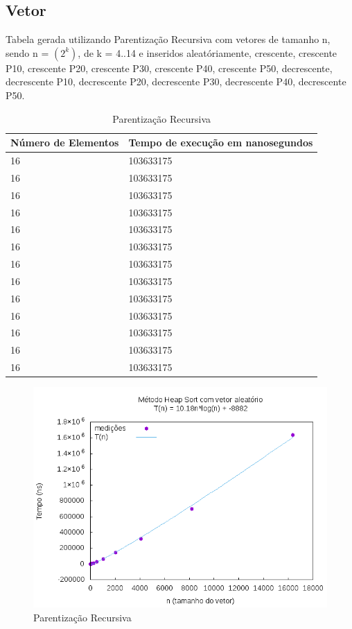 \documentclass[12pt,a4paper,twoside]{report}
\begin{document}
\subsection{Vetor}
Tabela gerada utilizando Parentização Recursiva com vetores de tamanho n, sendo n = $(2^k)$, de k = 4..14 e inseridos aleatóriamente, crescente, crescente P10, crescente P20, crescente P30, crescente P40, crescente P50, decrescente, decrescente P10, decrescente P20, decrescente P30, decrescente P40, decrescente P50.
\begin{table}[H]
\centering
\caption{Parentização Recursiva}
\label{my-label}
\begin{tabular}{|l|l|}
\hline
\multicolumn{1}{|c|}{\textbf{Número de Elementos}} & \multicolumn{1}{c|}{\textbf{Tempo de execução em nanosegundos}} \\ \hline
16 & 103633175 \\ \hline
16 & 103633175 \\ \hline
16 & 103633175 \\ \hline
16 & 103633175 \\ \hline
16 & 103633175 \\ \hline
16 & 103633175 \\ \hline
16 & 103633175 \\ \hline
16 & 103633175 \\ \hline
16 & 103633175 \\ \hline
16 & 103633175 \\ \hline
16 & 103633175 \\ \hline
16 & 103633175 \\ \hline
16 & 103633175 \\ \hline
\end{tabular}
\end{table}

\begin{figure}[H]
    \centering
    \includegraphics[width=0.7\linewidth]{graficos/HeapSort/vIntAleatorio/vIntAleatorio.png}
  \caption{Parentização Recursiva}
\end{figure}
\end{document}
